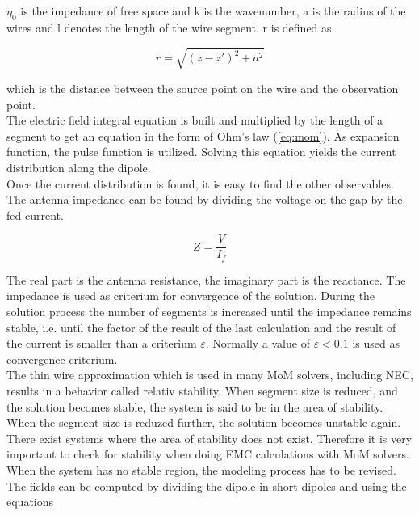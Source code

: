 \documentclass[a4paper,11pt]{thesis}
\begin{document}
$\eta_0$ is the impedance of free space and k is the wavenumber, a is the radius of the wires and l denotes the length of the wire segment. r is defined as

\begin{equation}
 r=\sqrt{(z-z')^2+a^2}
\end{equation}

which is the distance between the source point on the wire and the observation point.\\

The electric field integral equation is built and multiplied by the length of a segment to get an equation in the form of Ohm's law (\ref{eq:mom}). As expansion function, the pulse function is utilized. Solving this equation yields the current distribution along the dipole.\\

Once the current distribution is found, it is easy to find the other observables. The antenna impedance can be found by dividing the voltage on the gap by the fed current.

\begin{equation}
    Z=\frac{V}{I_f}
\end{equation}

The real part is the antenna resistance, the imaginary part is the reactance. The impedance is used as criterium for convergence of the solution. During the solution process the number of segments is increased until the impedance remains stable, i.e. until the factor of the result of the last calculation and the result of the current is smaller than a criterium $\varepsilon$. Normally a value of $\varepsilon < 0.1$ is used as convergence criterium.\\

 The thin wire approximation which is used in many MoM solvers, including NEC, results in a behavior called relativ stability. When segment size is reduced, and the solution becomes stable, the system is said to be in the area of stability. When the segment size is reduzed further, the solution becomes unstable again. There exist systems where the area of stability does not exist. Therefore it is very important to check for stability when doing EMC calculations with MoM solvers. When the system has no stable region, the modeling process has to be revised.\\

The fields can be computed by dividing the dipole in short dipoles and using the equations
\end{document}
